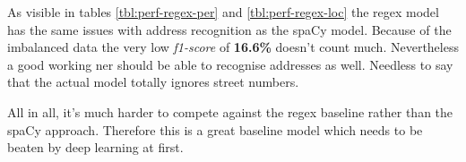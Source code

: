 As visible in tables \ref{tbl:perf-regex-per} and \ref{tbl:perf-regex-loc} the regex model has the same issues with address recognition as the spaCy model. Because of the
imbalanced data the very low \emph{f1-score} of \textbf{16.6\%} doesn't count much. Nevertheless a good working \acrlong{ner} should be able to recognise addresses
as well. Needless to say that the actual model totally ignores street numbers.

All in all, it's much harder to compete against the regex baseline rather than the spaCy approach. Therefore this is a great baseline model which needs to be beaten
by deep learning at first.
